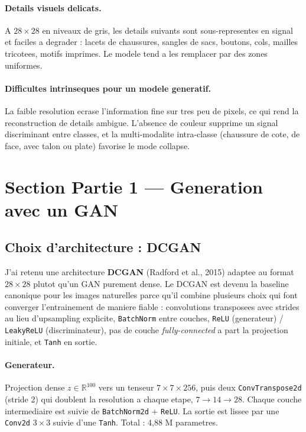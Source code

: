 \documentclass[11pt,a4paper]{article}
\begin{document}
\paragraph{Details visuels delicats.} A $28 \times 28$ en niveaux de gris, les details suivants sont sous-representes en signal et faciles a degrader : lacets de chaussures, sangles de sacs, boutons, cols, mailles tricotees, motifs imprimes. Le modele tend a les remplacer par des zones uniformes.

\paragraph{Difficultes intrinseques pour un modele generatif.} La faible resolution ecrase l'information fine sur tres peu de pixels, ce qui rend la reconstruction de details ambigue. L'absence de couleur supprime un signal discriminant entre classes, et la multi-modalite intra-classe (chaussure de cote, de face, avec talon ou plate) favorise le mode collapse.

\section{Section Partie 1 --- Generation avec un GAN}

\subsection{Choix d'architecture : DCGAN}

J'ai retenu une architecture \textbf{DCGAN} (Radford et al., 2015) adaptee au format $28 \times 28$ plutot qu'un GAN purement dense. Le DCGAN est devenu la baseline canonique pour les images naturelles parce qu'il combine plusieurs choix qui font converger l'entrainement de maniere fiable : convolutions transposees avec strides au lieu d'upsampling explicite, \texttt{BatchNorm} entre couches, \texttt{ReLU} (generateur) / \texttt{LeakyReLU} (discriminateur), pas de couche \emph{fully-connected} a part la projection initiale, et \texttt{Tanh} en sortie.

\paragraph{Generateur.} Projection dense $z \in \mathbb{R}^{100}$ vers un tenseur $7 \times 7 \times 256$, puis deux \texttt{ConvTranspose2d} (stride 2) qui doublent la resolution a chaque etape, $7 \to 14 \to 28$. Chaque couche intermediaire est suivie de \texttt{BatchNorm2d} + \texttt{ReLU}. La sortie est lissee par une \texttt{Conv2d} $3 \times 3$ suivie d'une \texttt{Tanh}. Total : 4{,}88 M parametres.
\end{document}
